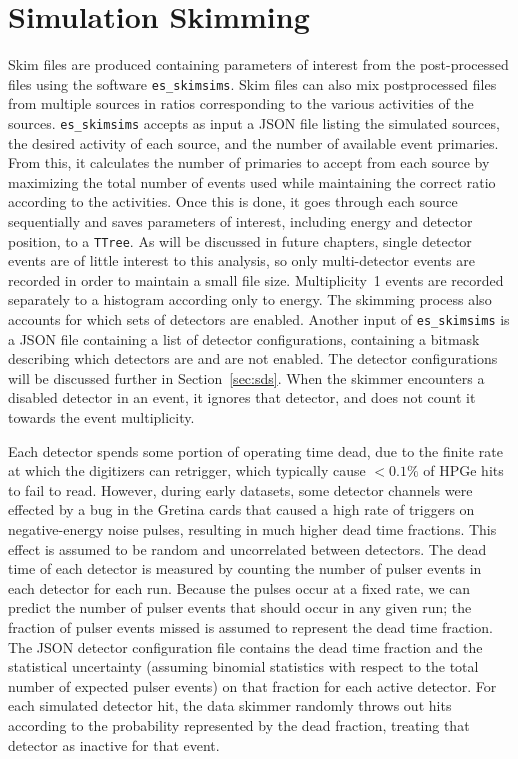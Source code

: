 \documentclass[notitlepage,rmp,aps,10pt]{revtex4-1}
\begin{document}
\section{Simulation Skimming} \label{sec:simskim}
Skim files are produced containing parameters of interest from the post-processed files using the software \texttt{es\_skimsims}.
Skim files can also mix postprocessed files from multiple sources in ratios corresponding to the various activities of the sources.
\texttt{es\_skimsims} accepts as input a JSON file listing the simulated sources, the desired activity of each source, and the number of available event primaries.
From this, it calculates the number of primaries to accept from each source by maximizing the total number of events used while maintaining the correct ratio according to the activities.
Once this is done, it goes through each source sequentially and saves parameters of interest, including energy and detector position, to a \texttt{TTree}\cite{rootcern}.
As will be discussed in future chapters, single detector events are of little interest to this analysis, so only multi-detector events are recorded in order to maintain a small file size.
Multiplicity~1 events are recorded separately to a histogram according only to energy.
The skimming process also accounts for which sets of detectors are enabled.
Another input of \texttt{es\_skimsims} is a JSON file containing a list of detector configurations, containing a bitmask describing which detectors are and are not enabled.
The detector configurations will be discussed further in Section~\ref{sec:sds}.
When the skimmer encounters a disabled detector in an event, it ignores that detector, and does not count it towards the event multiplicity.
 
Each detector spends some portion of operating time dead, due to the finite rate at which the digitizers can retrigger, which typically cause $<0.1\%$ of HPGe hits to fail to read.
However, during early datasets, some detector channels were effected by a bug in the Gretina cards that caused a high rate of triggers on negative-energy noise pulses, resulting in much higher dead time fractions.
This effect is assumed to be random and uncorrelated between detectors.
The dead time of each detector is measured by counting the number of pulser events in each detector for each run.
Because the pulses occur at a fixed rate, we can predict the number of pulser events that should occur in any given run; the fraction of pulser events missed is assumed to represent the dead time fraction.
The JSON detector configuration file contains the dead time fraction and the statistical uncertainty (assuming binomial statistics with respect to the total number of expected pulser events) on that fraction for each active detector.
For each simulated detector hit, the data skimmer randomly throws out hits according to the probability represented by the dead fraction, treating that detector as inactive for that event.
\end{document}
